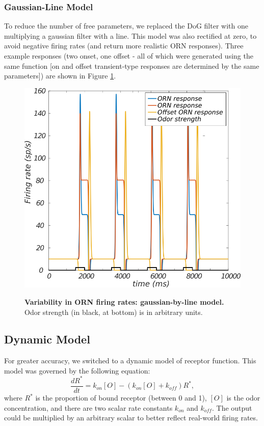 \documentclass[a4paper,12pt,twoside]{article}
\begin{document}
\subsubsection{Gaussian-Line Model}
To reduce the number of free parameters, we replaced the DoG filter with one multiplying a gaussian filter with a line.  This model was also rectified at zero, to avoid negative firing rates (and return more realistic ORN responses).  Three example responses (two onset, one offset - all of which were generated using the same function [on and offset transient-type responses are determined by the same parameters]) are shown in Figure \ref{fig:orn2}.  


\begin{figure}
\centering
\caption{\textbf{Variability in ORN firing rates: gaussian-by-line model.}  Odor strength (in black, at bottom) is in arbitrary units. \newline}
\hspace*{-1.25cm}
\includegraphics[scale=0.7]{2016-08-05_gauss_line_linear_model.png}
\label{fig:orn2}
\end{figure}

\subsection{Dynamic Model}
For greater accuracy, we switched to a dynamic model of receptor function.  This model was governed by the following equation:
\begin{equation}
\frac{dR^*}{dt} = k_{on}[O] - (k_{on}[O] + k_{off})R^*,
\end{equation}
where $R^*$ is the proportion of bound receptor (between 0 and 1), $[O]$ is the odor concentration, and there are two scalar rate constants $k_{on}$ and $k_{off}.$  The output could be multiplied by an arbitrary scalar to better reflect real-world firing rates.
\end{document}
